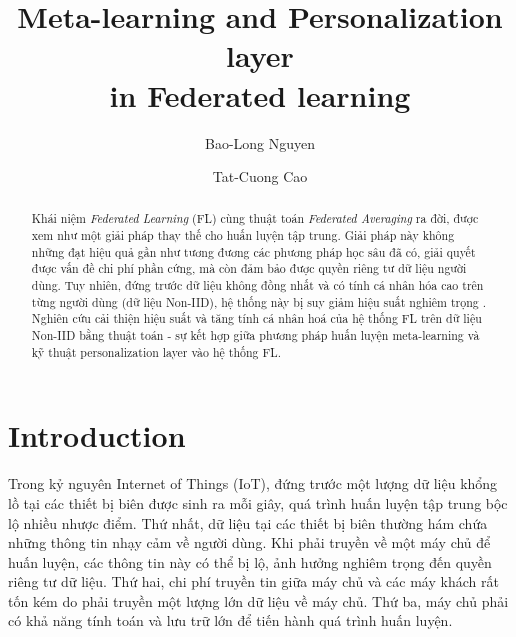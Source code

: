 \documentclass[runningheads]{llncs}
\begin{document}
%
\title{Meta-learning and Personalization layer \\in Federated learning}
%
%
\author{Bao-Long Nguyen \\\and
Tat-Cuong Cao}
%
%
%
\maketitle              %
%
\begin{abstract}
Khái niệm \textit{Federated Learning} (FL) cùng thuật toán \textit{Federated Averaging} ra đời, được xem như một giải pháp thay thế cho huấn luyện tập trung. Giải pháp này không những đạt hiệu quả gần như tương đương các phương pháp học sâu đã có, giải quyết được vấn đề chi phí phần cứng, mà còn đảm bảo được quyền riêng tư dữ liệu người dùng. Tuy nhiên, đứng trước dữ liệu không đồng nhất và có tính cá nhân hóa cao trên từng người dùng (dữ liệu Non-IID), hệ thống này bị suy giảm hiệu suất nghiêm trọng \cite{zhao2018federated}. Nghiên cứu cải thiện hiệu suất và tăng tính cá nhân hoá của hệ thống FL trên dữ liệu Non-IID bằng thuật toán  - sự kết hợp giữa phương pháp huấn luyện meta-learning \cite{hospedales2020meta} và kỹ thuật personalization layer \cite{zhu2021federated} vào hệ thống FL.

\end{abstract}
%
%
%

\section{Introduction}

Trong kỷ nguyên Internet of Things (IoT), đứng trước một lượng dữ liệu khổng lồ tại các thiết bị biên được sinh ra mỗi giây, quá trình huấn luyện tập trung bộc lộ nhiều nhược điểm. Thứ nhất, dữ liệu tại các thiết bị biên thường hám chứa những thông tin nhạy cảm về người dùng. Khi phải truyền về một máy chủ để huấn luyện, các thông tin này có thể bị lộ, ảnh hưởng nghiêm trọng đến quyền riêng tư dữ liệu. Thứ hai, chi phí truyền tin giữa máy chủ và các máy khách rất tốn kém do phải truyền một lượng lớn dữ liệu về máy chủ. Thứ ba, máy chủ phải có khả năng tính toán và lưu trữ lớn để tiến hành quá trình huấn luyện.
\end{document}
